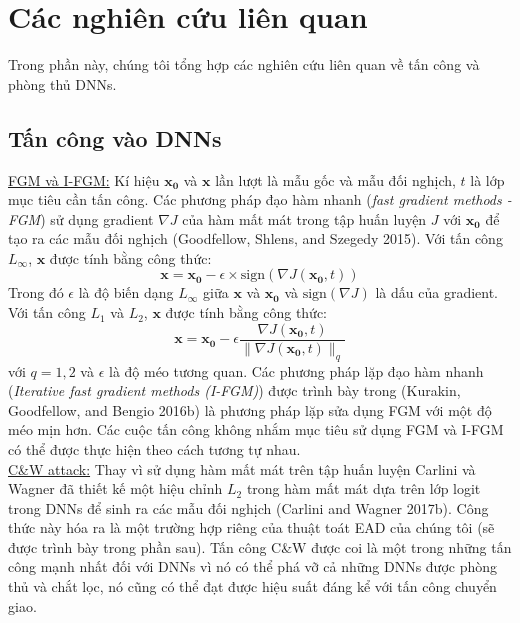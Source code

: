 \chapter{Các nghiên cứu liên quan}
Trong phần này, chúng tôi tổng hợp các nghiên cứu liên quan về tấn công và phòng thủ DNNs.

\section{Tấn công vào DNNs}
\underline{FGM và I-FGM:} Kí hiệu $\mathbf{x_0}$ và $\mathbf{x}$ lần lượt là mẫu gốc và mẫu đối nghịch,
$t$ là lớp mục tiêu cần tấn công. Các phương pháp đạo hàm nhanh (\textit{fast gradient 
methods - FGM}) sử dụng gradient $\nabla J$ của hàm mất mát trong tập huấn luyện $J$ với $\mathbf{x_0}$
để tạo ra các mẫu đối nghịch (Goodfellow, Shlens, and Szegedy 2015). Với tấn công $L_{\infty}$, 
$\mathbf{x}$ được tính bằng công thức:
\begin{equation}
    \mathbf{x} = \mathbf{x_0} - \epsilon \times \text{sign}(\nabla J(\mathbf{x_0}, t))
\end{equation}
Trong đó $\epsilon$ là độ biến dạng $L_{\infty}$ giữa $\mathbf{x}$ và $\mathbf{x_0}$ và 
$\text{sign}(\nabla J)$ là dấu của gradient. Với tấn công $L_1$ và $L_2$, $\mathbf{x}$ 
được tính bằng công thức:
\begin{equation}
    \mathbf{x} = \mathbf{x_0} - \epsilon \frac{\nabla J(\mathbf{x_0}, t)}
    {\lVert \nabla J(\mathbf{x_0}, t) \rVert _q}
\end{equation}
với $q = 1,2$ và $\epsilon$ là độ méo tương quan. Các phương pháp lặp đạo hàm nhanh 
(\textit{Iterative fast gradient methods (I-FGM)}) được trình bày trong (Kurakin, Goodfellow, 
and Bengio 2016b) là phương pháp lặp sửa dụng FGM với một độ méo mịn hơn. Các cuộc tấn công 
không nhắm mục tiêu sử dụng FGM và I-FGM có thể được thực hiện theo cách tương tự nhau. \\

\underline{C\&W attack:} Thay vì sử dụng hàm mất mát trên tập huấn luyện Carlini và Wagner
đã thiết kế  một hiệu chỉnh $L_2$ trong hàm mất mát dựa trên lớp logit trong DNNs để sinh 
ra các mẫu đối nghịch (Carlini and Wagner 2017b). Công thức này hóa ra là một trường hợp riêng của 
thuật toát EAD của chúng tôi (sẽ được trình bày trong phần sau). Tấn công C\&W được coi 
là một trong những tấn công mạnh nhất đối với DNNs vì nó có thể phá vỡ cả những DNNs được 
phòng thủ và chắt lọc, nó cũng có thể đạt được hiệu suất đáng kể với tấn công chuyển giao. \\

